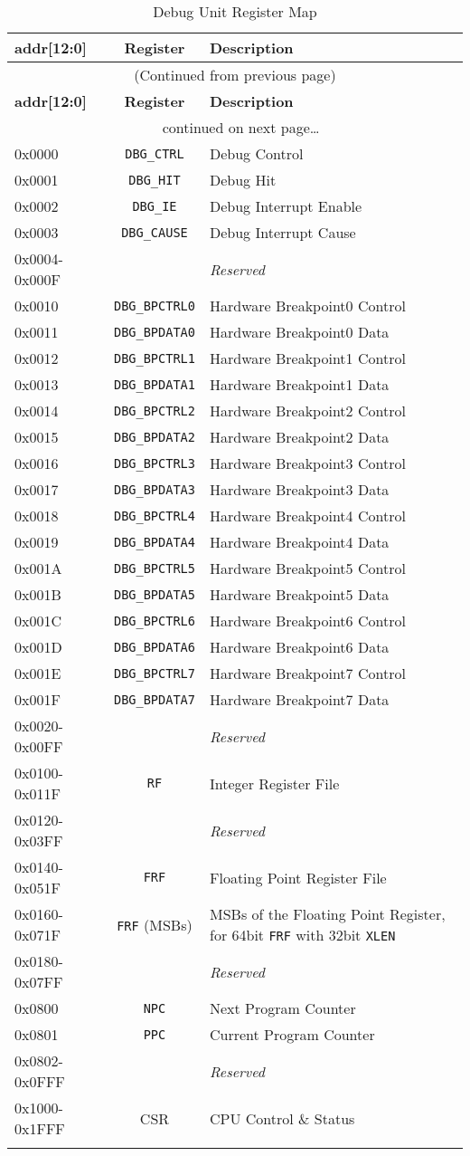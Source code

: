 \begin{longtable}[]{@{}lcp{5cm}@{}}
\toprule
\textbf{addr{[}12:0{]}} & \textbf{Register} & \textbf{Description}\tabularnewline
\midrule
\endfirsthead
\multicolumn{3}{c}{{(Continued from previous page)}} \\
\toprule
\textbf{addr{[}12:0{]}} & \textbf{Register} & \textbf{Description}\tabularnewline
\midrule
\endhead
\midrule \multicolumn{3}{c}{{\tablename\ \thetable{} continued on next page\ldots}} \\
\endfoot
\endlastfoot

0x0000        & \texttt{DBG\_CTRL} & Debug Control\tabularnewline
0x0001        & \texttt{DBG\_HIT} & Debug Hit\tabularnewline
0x0002        & \texttt{DBG\_IE} & Debug Interrupt Enable\tabularnewline
0x0003        & \texttt{DBG\_CAUSE} & Debug Interrupt Cause\tabularnewline
0x0004-0x000F & & \emph{Reserved}\tabularnewline
0x0010        & \texttt{DBG\_BPCTRL0} & Hardware Breakpoint0 Control\tabularnewline
0x0011        & \texttt{DBG\_BPDATA0} & Hardware Breakpoint0 Data\tabularnewline
0x0012        & \texttt{DBG\_BPCTRL1} & Hardware Breakpoint1 Control\tabularnewline
0x0013        & \texttt{DBG\_BPDATA1} & Hardware Breakpoint1 Data\tabularnewline
0x0014        & \texttt{DBG\_BPCTRL2} & Hardware Breakpoint2 Control\tabularnewline
0x0015        & \texttt{DBG\_BPDATA2} & Hardware Breakpoint2 Data\tabularnewline
0x0016        & \texttt{DBG\_BPCTRL3} & Hardware Breakpoint3 Control\tabularnewline
0x0017        & \texttt{DBG\_BPDATA3} & Hardware Breakpoint3 Data\tabularnewline
0x0018        & \texttt{DBG\_BPCTRL4} & Hardware Breakpoint4 Control\tabularnewline
0x0019        & \texttt{DBG\_BPDATA4} & Hardware Breakpoint4 Data\tabularnewline
0x001A        & \texttt{DBG\_BPCTRL5} & Hardware Breakpoint5 Control\tabularnewline
0x001B        & \texttt{DBG\_BPDATA5} & Hardware Breakpoint5 Data\tabularnewline
0x001C        & \texttt{DBG\_BPCTRL6} & Hardware Breakpoint6 Control\tabularnewline
0x001D        & \texttt{DBG\_BPDATA6} & Hardware Breakpoint6 Data\tabularnewline
0x001E        & \texttt{DBG\_BPCTRL7} & Hardware Breakpoint7 Control\tabularnewline
0x001F        & \texttt{DBG\_BPDATA7} & Hardware Breakpoint7 Data\tabularnewline
0x0020-0x00FF & & \emph{Reserved}\tabularnewline
0x0100-0x011F & \texttt{RF} & Integer Register File\tabularnewline
0x0120-0x03FF & & \emph{Reserved}\tabularnewline
0x0140-0x051F & \texttt{FRF} & Floating Point Register File\tabularnewline
0x0160-0x071F & \texttt{FRF} (MSBs) & MSBs of the Floating Point Register, for
64bit \texttt{FRF} with 32bit \texttt{XLEN}\tabularnewline
0x0180-0x07FF & & \emph{Reserved}\tabularnewline
0x0800        & \texttt{NPC}  & Next Program Counter\tabularnewline
0x0801        & \texttt{PPC}  & Current Program Counter\tabularnewline
0x0802-0x0FFF & & \emph{Reserved}\tabularnewline
0x1000-0x1FFF & CSR & CPU Control \& Status\tabularnewline
\bottomrule
\caption{Debug Unit Register Map}
\label{tab:debug-reg-map}
\end{longtable}

